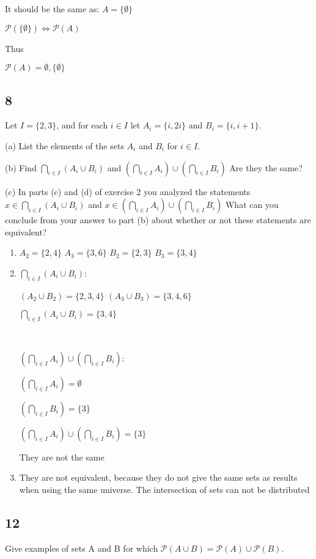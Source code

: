 \documentclass{article}
\begin{document}
It should be the same as:
$A= \{ \emptyset \}$

$\mathscr{P}(\{ \emptyset \}) \Leftrightarrow \mathscr{P}(A)$

Thus 

$\mathscr{P}(A) = \emptyset , \{ \emptyset \}$
\subsection{8}
Let $I = \{2, 3\}$, and for each $i \in I$ let $A_i = \{i, 2i \}$ and $B_i = \{i, i + 1 \}$.
 
(a) List the elements of the sets $A_i$ and $B_i$ for $i \in I$.

(b) Find $\bigcap_{i \in I}(A_i \cup B_i)$ and $(\bigcap_{i \in I} A_i) \cup (\bigcap_{i \in I}B_i)$ Are they the same? 

(c) In parts (c) and (d) of exercise 2 you analyzed the statements $x \in \bigcap_{i \in I}
(A_i \cup B_i)$ and $x \in (\bigcap_{i \in I} A_i) \cup (\bigcap_{i \in I}B_i)$
What can you conclude
from your answer to part (b) about whether or not these statements
are equivalent?
\begin{enumerate}[label=(\alph*)]
    \item
    
    $A_2=\{ 2,4 \}$
    $A_3=\{ 3,6 \}$
    $B_2=\{ 2,3 \}$
    $B_3=\{ 3,4 \}$
    \item
    $\bigcap_{i \in I}(A_i \cup B_i)$:
    
    $(A_2 \cup B_2)= \{ 2,3,4 \}$
    $(A_3 \cup B_3)= \{ 3,4,6 \}$
    
    $\bigcap_{i \in I}(A_i \cup B_i)= \{ 3,4 \}$
    
    \
    
    $(\bigcap_{i \in I} A_i) \cup (\bigcap_{i \in I}B_i)$:
    
    $(\bigcap_{i \in I} A_i)=\emptyset$
    
    $(\bigcap_{i \in I}B_i)= \{ 3 \}$
    
    $(\bigcap_{i \in I} A_i) \cup (\bigcap_{i \in I}B_i)= \{ 3 \}$
    
    They are not the same
    
    \item
    They are not equivalent, because they do not give the same sets as results when using the same universe. The intersection of sets can not be distributed
\end{enumerate}
\subsection{12}
Give examples of sets A and B for which $\mathscr{P}(A \cup B) = \mathscr{P}(A) \cup \mathscr{P}(B)$.
\end{document}
